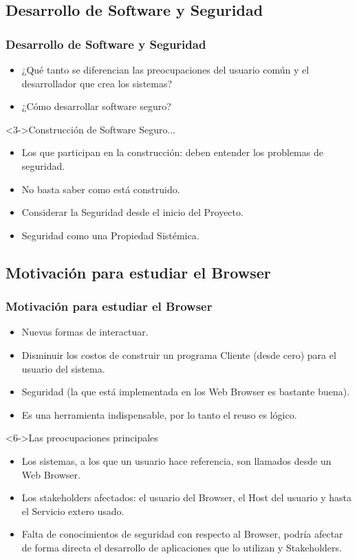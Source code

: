 \documentclass[serif,9pt]{beamer}
\begin{document}
\subsection{Desarrollo de Software y Seguridad}
\begin{frame}
\frametitle{Desarrollo de Software y Seguridad}
	\begin{itemize}
		\item<1-> ¿Qu\'e tanto se diferencian las preocupaciones del usuario com\'un y el desarrollador que crea los sistemas?
		\item<2-> ¿C\'omo desarrollar software seguro?
	\end{itemize}
	\begin{block}<3->{Construcci\'on de Software Seguro...}
		\begin{itemize}
			\item<4-> Los que participan en la construcci\'on: deben entender los problemas de seguridad.
			\item<5-> No basta saber como est\'a construido.
			\item<6-> Considerar la Seguridad desde el inicio del Proyecto.
			\item<7-> Seguridad como una Propiedad Sist\'emica.
		\end{itemize}
	\end{block}
\end{frame}


\subsection{Motivaci\'on para estudiar el Browser}
\begin{frame}
	\frametitle{Motivaci\'on para estudiar el Browser}
	\begin{itemize}
		\item<2-> Nuevas formas de interactuar.
		\item<3-> Disminuir los costos de construir un programa Cliente (desde cero) para
el usuario del sistema.
		\item<4-> Seguridad (la que est\'a implementada en los Web Browser es bastante buena).
		\item<5-> Es una herramienta indispensable, por lo tanto el reuso es lógico.
	\end{itemize}
	
	\begin{block}<6->{Las preocupaciones principales}
	\begin{itemize}
		\item<7-> Los sistemas, a los que un usuario hace referencia, son llamados desde un Web Browser.
		\item<8-> Los stakeholders afectados: el usuario del Browser, el Host del usuario y hasta el Servicio extero usado.
		\item<9-> Falta de conocimientos de seguridad con respecto al Browser, podr\'ia afectar de forma directa el desarrollo de aplicaciones que lo utilizan y Stakeholders.
	\end{itemize}
	\end{block}
\end{frame}
\end{document}

